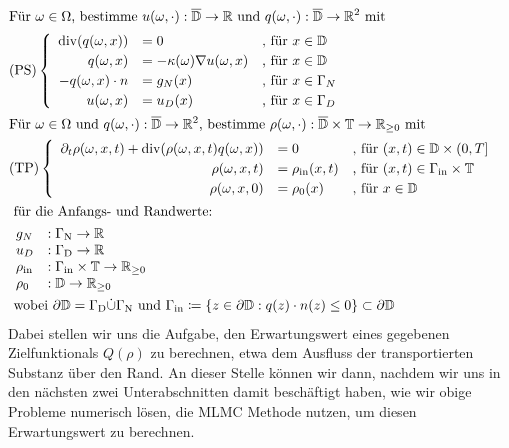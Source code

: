 \begin{align*}
\setlength\arraycolsep{1pt}
&\text{Für } \omega \in \Omega \text{, bestimme } u(\omega,\cdot):\overline{\mathbb{D}} \to \R \text{ und } q(\omega, \cdot): \overline{\mathbb{D}} \to \R^2 \text{ mit } \\
&\text{(PS)}
	\begin{cases}
		\begin{array}{rlll}
		\dive (q(\omega,x)) &= 0  &\text{, für } x \in \mathbb{ D}\\  
		q(\omega,x) &= - \kappa(\omega) \nabla u(\omega,x)  &\text{, für } x \in \mathbb{D}\\
		-q(\omega,x) \cdot n &= g_N(x)  &\text{, für } x \in \Gamma_N \\
		u(\omega,x) &= u_D(x)  &\text{, für } x \in \Gamma_D \\
		\end{array}
	\end{cases} \\
&\text{Für } \omega \in \Omega \text{ und }q(\omega,\cdot): \overline{\mathbb{D}} \to \R^2 \text{, bestimme }\rho(\omega,\cdot): \overline{\mathbb{D}} \times \mathbb{T} \to \R_{\geq 0} \text{ mit} \\
&\text{(TP)} 
	\begin{cases}
		\begin{array}{rlll}
			\partial_t \rho (\omega, x, t) + \dive(\rho(\omega,x,t)q(\omega,x)) &= 0 &\text{, für } (x,t) \in \mathbb{D} \times (0,T] \\
			\rho(\omega,x,t) &= \rho_{\text{in}}(x,t) &\text{, für } (x,t) \in \Gamma_{\text{in}} \times \mathbb{T} \\
			\rho(\omega,x,0)  &= \rho_0(x) &\text{, für } x \in  \mathbb{D}
		\end{array}
	\end{cases} \\
&\text{ für die Anfangs- und Randwerte: } \\ 
	&\begin{array}{llr}
		g_N&: \Gamma_{\text{N}} \to \R \\
		u_D&: \Gamma_{\text{D}} \to \R \\
	    \rho_{\text{in}}&: \Gamma_{\text{in}} \times \mathbb{T} \to \R_{\geq0} \\
		\rho_0&: \mathbb{D} \to \R_{\geq0} \\
	\end{array} \newline \\
&\text{ wobei } \partial \mathbb{D} = \Gamma_{\text{D}} \dot{\cup} \Gamma_{\text{N}}  \text{ und }  \Gamma_{\text{in}} \coloneqq  \{ z \in \partial \mathbb{D}: q(z)\cdot n(z) \leq 0 \} \subset  \partial \mathbb{D}
\end{align*}
Dabei stellen wir uns die Aufgabe, den Erwartungswert eines gegebenen Zielfunktionals $Q(\rho)$ zu berechnen, etwa dem Ausfluss der transportierten Substanz über den Rand. An dieser Stelle können wir dann, nachdem wir uns in den nächsten zwei Unterabschnitten damit beschäftigt haben, wie wir obige Probleme numerisch lösen, die MLMC Methode nutzen, um diesen Erwartungswert zu berechnen. 
